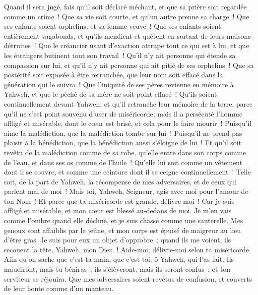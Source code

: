 \begin{multicols}{2}
Quand il sera jugé, fais qu'il soit déclaré méchant, et que sa prière soit regardée comme un crime~!
Que sa vie soit courte, et qu'un autre prenne sa charge~!
Que ses enfants soient orphelins, et sa femme veuve~!
Que ses enfants soient entièrement vagabonds, et qu'ils mendient et quêtent en sortant de leurs maisons détruites~!
Que le créancier usant d'exaction attrape tout ce qui est à lui, et que les étrangers butinent tout son travail~!
Qu'il n'y ait personne qui étende sa compassion sur lui, et qu'il n'y ait personne qui ait pitié de ses orphelins~!
Que sa postérité soit exposée à être retranchée, que leur nom soit effacé dans la génération qui le suivra~!
Que l'iniquité de ses pères revienne en mémoire à Yahweh, et que le péché de sa mère ne soit point effacé~!
Qu'ils soient continuellement devant Yahweh, et qu'il retranche leur mémoire de la terre,
parce qu'il ne s'est point souvenu d'user de miséricorde, mais il a persécuté l'homme affligé et misérable, dont le cœur est brisé, et cela pour le faire mourir~!
Puisqu'il aime la malédiction, que la malédiction tombe sur lui~! Puisqu'il ne prend pas plaisir à la bénédiction, que la bénédiction aussi s'éloigne de lui~!
Et qu'il soit revêtu de la malédiction comme de sa robe, qu'elle entre dans son corps comme de l'eau, et dans ses os comme de l'huile~!
Qu'elle lui soit comme un vêtement dont il se couvre, et comme une ceinture dont il se ceigne continuellement~!
Telle soit, de la part de Yahweh, la récompense de mes adversaires, et de ceux qui parlent mal de moi~!
Mais toi, Yahweh, Seigneur, agis avec moi pour l'amour de ton Nom~! Et parce que ta miséricorde est grande, délivre-moi~!
Car je suis affligé et misérable, et mon cœur est blessé au-dedans de moi.
Je m'en vais comme l'ombre quand elle décline, et je suis chassé comme une sauterelle.
Mes genoux sont affaiblis par le jeûne, et mon corps est épuisé de maigreur au lieu d'être gras.
Je suis pour eux un objet d'opprobre~; quand ils me voient, ils secouent la tête.
Yahweh, mon Dieu~! Aide-moi, délivre-moi selon ta miséricorde.
Afin qu'on sache que c'est ta main, que c'est toi, ô Yahweh, qui l'as fait.
Ils maudiront, mais tu béniras~; ils s'élèveront, mais ils seront confus~; et ton serviteur se réjouira.
Que mes adversaires soient revêtus de confusion, et couverts de leur honte comme d'un manteau.

\end{multicols}
